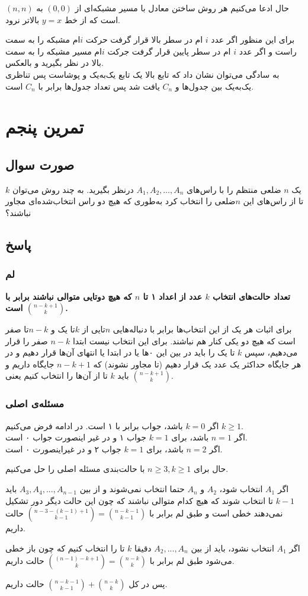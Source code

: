 \documentclass[12pt,a4paper]{article}
\begin{document}
حال ادعا می‌کنیم هر روش ساختن معادل با مسیر مشبکه‌ای از $(0, 0)$ به $(n, n)$ است که از خط $y=x$ بالاتر نرود.

برای این منظور اگر عدد $i$ ام در سطر بالا قرار گرفت حرکت $i$ام مشبکه را به سمت راست و اگر عدد $i$ ام در سطر پایین قرار گرفت جرکت $i$ام مسیر مشبکه را به سمت بالا در نظر بگیرید و بالعکس.
\\
به سادگی می‌توان نشان داد که تابع بالا یک تابع یک‌به‌یک و پوشاست پس تناظری یک‌به‌یک بین جدول‌ها و $C_n$ یافت شد پس تعداد جدول‌ها برابر با $C_n$ است.

\section{تمرین پنجم}
\subsection{صورت سوال}
یک $n$ ضلعی منتظم را با راس‌های $A_1, A_2, \dots, A_n$ درنظر بگیرید. به چند روش می‌توان $k$ تا از راس‌های این $n$ضلعی را انتخاب کرد به‌طوری که هیچ دو راس انتخاب‌شده‌ای مجاور نباشند؟
\subsection{پاسخ}
\subsubsection{لم}
\textbf{
تعداد حالت‌های انتخاب $k$ عدد از اعداد ۱ تا $n$ که هیچ دوتایی متوالی نباشند برابر با 
$\binom{n-k+1}{k}$
است.
}

برای اثبات هر یک از این انتخاب‌ها برابر با دنباله‌هایی $n$تایی از $k$تا یک و $n-k$تا صفر است که هیچ دو یکی کنار هم نباشند. برای این انتخاب نیست ابتدا $n-k$ صفر را قرار می‌دهیم، سپس $k$ تا یک را باید در بین این ۰‌‌ها یا در ابتدا یا انتهای آن‌ها قرار دهیم و در هر جایگاه حداکثر یک عدد یک قرار دهیم (تا مجاور نشوند) که $n-k+1$ جایگاه داریم و باید $k$ تا از آن‌ها را انتخاب کنیم یعنی $\binom{n-k+1}{k}$.
\subsubsection{مسئله‌ی اصلی}
اگر $k=0$ باشد، جواب برابر با ۱ است. در ادامه فرض می‌کنیم $k \geq 1$.
\\
اگر $n=1$ باشد، برای $k =  1$ جواب ۱ و در غیر اینصورت جواب ۰ است.
\\
اگر $n=2$ باشد، برای $k=1$ جواب ۲ و در غیراینصورت ۰ است.

حال برای 
$n \geq 3, k \geq 1$
با حالت‌بندی مسئله اصلی را حل می‌کنیم.

اگر $A_1$ انتخاب شود، $A_2$ و $A_n$ حتما انتخاب نمی‌شوند و از بین $A_3, A_4, ..., A_{n-1}$ باید $k-1$ تا انتخاب شوند که هیچ کدام متوالی نباشند که چون این حالت دیگر دور تشکیل نمی‌دهند خطی است و طبق لم برابر با 
$\binom{n-3-(k-1)+1}{k-1} = \binom{n-k-1}{k-1}$
حالت داریم.

اگر $A_1$ انتخاب نشود، باید از بین $A_2, ..., A_{n}$ دقیقا $k$ تا را انتخاب کنیم که چون باز خطی می‌شود طبق لم برابر با
$\binom{(n-1)-k+1}{k} = \binom{n-k}{k}$
حالت داریم.

پس در کل
$\binom{n-k-1}{k-1} + \binom{n-k}{k}$
حالت داریم.
\end{document}
